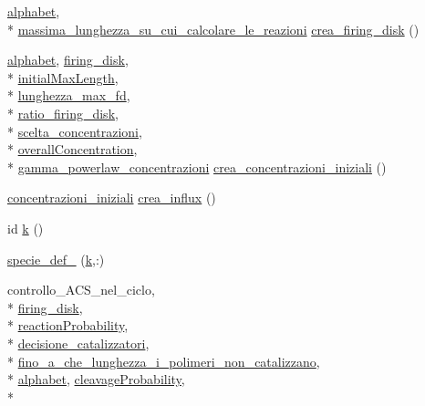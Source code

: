 \begin{DoxyCompactItemize}
\hyperlink{a00113_abcbc32fc68e4323620d6171a17310212}{alphabet}, \\*
\hyperlink{a00113_a4e714d8e6551275aafab501b8c9f18ad}{massima\+\_\+lunghezza\+\_\+su\+\_\+cui\+\_\+calcolare\+\_\+le\+\_\+reazioni} \hyperlink{a00110_a9436783422a447fac5122c24d195e61d}{crea\+\_\+firing\+\_\+disk} ()
\item 
\hyperlink{a00113_abcbc32fc68e4323620d6171a17310212}{alphabet}, \hyperlink{a00103_acb72987b5000cf59c6f81c482e2ac8ac}{firing\+\_\+disk}, \\*
\hyperlink{a00112_a4c7433c24b6426a15069cc5a93a5cbec}{initial\+Max\+Length}, \\*
\hyperlink{a00113_a7c974cc56015b6503e0619d32ebd4180}{lunghezza\+\_\+max\+\_\+fd}, \\*
\hyperlink{a00112_acd685f63a27f53fc049aff633634ddd6}{ratio\+\_\+firing\+\_\+disk}, \\*
\hyperlink{a00113_ac60b74a4c1b8bc23e64008ba1e0c41a8}{scelta\+\_\+concentrazioni}, \\*
\hyperlink{a00113_a59597688ed79473c0234f45eb9167574}{overall\+Concentration}, \\*
\hyperlink{a00113_a7cd0915d7542523abc226a8eecf67ecf}{gamma\+\_\+powerlaw\+\_\+concentrazioni} \hyperlink{a00110_a46820e2abe661887eb3c03ebcdd5aa14}{crea\+\_\+concentrazioni\+\_\+iniziali} ()
\item 
\hyperlink{a00103_a89801fa89eee3ba40f6610f290d6f6c3}{concentrazioni\+\_\+iniziali} \hyperlink{a00110_aedefd8a9b5b6248834cd58472da4be7d}{crea\+\_\+influx} ()
\item 
id \hyperlink{a00110_abf70355c2e58f64c6b18bda1b9bccfd7}{k} ()
\item 
\hyperlink{a00110_a206c02e53d19e1a7f6c297114dd5becb}{specie\+\_\+def\+\_} (\hyperlink{a00110_abf70355c2e58f64c6b18bda1b9bccfd7}{k},\+:)
\item 
controllo\+\_\+\+A\+C\+S\+\_\+nel\+\_\+ciclo, \\*
\hyperlink{a00103_acb72987b5000cf59c6f81c482e2ac8ac}{firing\+\_\+disk}, \\*
\hyperlink{a00113_a9101beaeb03fddb5c6a9e68442177543}{reaction\+Probability}, \\*
\hyperlink{a00113_a78948f867453293fcff0835b1bb05b8c}{decisione\+\_\+catalizzatori}, \\*
\hyperlink{a00113_ab6966d9ee620bc7376dc41a38352b948}{fino\+\_\+a\+\_\+che\+\_\+lunghezza\+\_\+i\+\_\+polimeri\+\_\+non\+\_\+catalizzano}, \\*
\hyperlink{a00113_abcbc32fc68e4323620d6171a17310212}{alphabet}, \hyperlink{a00113_a9d512df05ee559766d2b8f08e4704b04}{cleavage\+Probability}, \\*

\end{DoxyCompactItemize}
